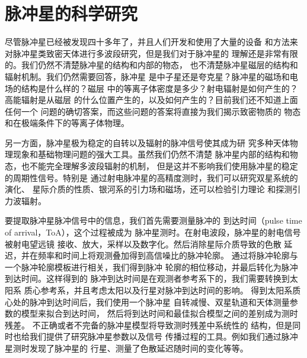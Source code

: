 \section{脉冲星的科学研究}

尽管脉冲星已经被发现四十多年了，并且人们开发和使用了大量的设备
和方法来对脉冲星类致密天体进行多波段研究，但是我们对于脉冲星的
理解还是非常有限的。我们仍然不清楚脉冲星的结构和内部的物态，
也不清楚脉冲星磁层的结构和辐射机制。我们仍然需要回答，脉冲星
是中子星还是夸克星？脉冲星的磁场和电场的结构是什么样的？磁层
中的等离子体密度是多少？射电辐射是如何产生的？高能辐射是从磁层
的什么位置产生的，以及如何产生的？目前我们还不知道上面任何一个
问题的确切答案，而这些问题的答案将直接为我们揭示致密物质的
物态和在极端条件下的等离子体物理。

另一方面，脉冲星极为稳定的自转以及辐射的脉冲信号使其成为研
究多种天体物理现象和基础物理问题的强大工具。虽然我们仍然不清楚
脉冲星内部的结构和物态，也不能完全理解多波段辐射的机制，
但是这并不影响我们使用脉冲星的稳定的周期性信号。特别是
通过射电脉冲星的高精度测时，我们可以研究双星系统的演化、
星际介质的性质、银河系的引力场和磁场，还可以检验引力理论
和探测引力波辐射。

要提取脉冲星脉冲信号中的信息，我们首先需要测量脉冲的
到达时间（pulse time of arrival，ToA），这个过程被成为
脉冲星测时。在射电波段，脉冲星的射电信号被射电望远镜
接收、放大，采样以及数字化。然后消除星际介质导致的色散
延迟，并在频率和时间上将观测叠加得到高信噪比的脉冲轮廓。
通过将脉冲轮廓与一个脉冲轮廓模板进行相关，我们得到脉冲
轮廓的相位移动，并最后转化为脉冲到达时间。这样得到的
脉冲到达时间是在观测者参考系下的，我们需要转换到太阳系
质心参考系，并且考虑太阳以及行星对脉冲到达时间的影响。
得到太阳系质心处的脉冲到达时间后，我们使用一个脉冲星
自转减慢、双星轨道和天体测量参数的模型来拟合到达时间，
然后将到达时间和最佳拟合模型之间的差别成为测时残差。
不正确或者不完备的脉冲星模型将导致测时残差中系统性的
结构，但是同时也给我们提供了研究脉冲星参数以及信号
传播过程的工具。例如我们通过脉冲星测时发现了脉冲星的
行星、测量了色散延迟随时间的变化等等。

